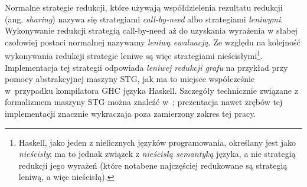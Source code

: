 Normalne strategie redukcji, które używają współdzielenia rezultatu redukcji (ang. \emph{sharing}) nazywa się strategiami \emph{call-by-need} albo strategiami \emph{leniwymi}. Wykonywanie redukcji strategią call-by-need aż do uzyskania wyrażenia w słabej czołowiej postaci normalnej nazywamy \emph{leniwą ewaluacją}. Ze względu na kolejność wykonywania redukcji strategie leniwe są więc strategiami nieścisłymi\footnote{Haskell, jako jeden z nielicznych języków programowania, określany jest jako \emph{nieścisły}; ma to jednak związek z \emph{nieścisłą semantyką} języka, a nie strategią redukcji jego wyrażeń (które notabene najczęściej redukowane są strategią leniwą, a więc nieścisłą).}. Implementacja tej strategii odpowiada \emph{leniwej redukcji grafu} \cite[Rozdział 12.1, str. 212]{PeytonJones:1987:IFP:1096899} na przykład przy pomocy abstrakcyjnej maszyny STG, jak ma to miejsce współcześnie w~przypadku kompilatora GHC języka Haskell. Szczegóły technicznie związane z formalizmem maszyny STG można znaleźć w~\cite{jones1992implementing}; prezentacja nawet zrębów tej implementacji znacznie wykraczaja poza zamierzony zakres tej pracy. 


